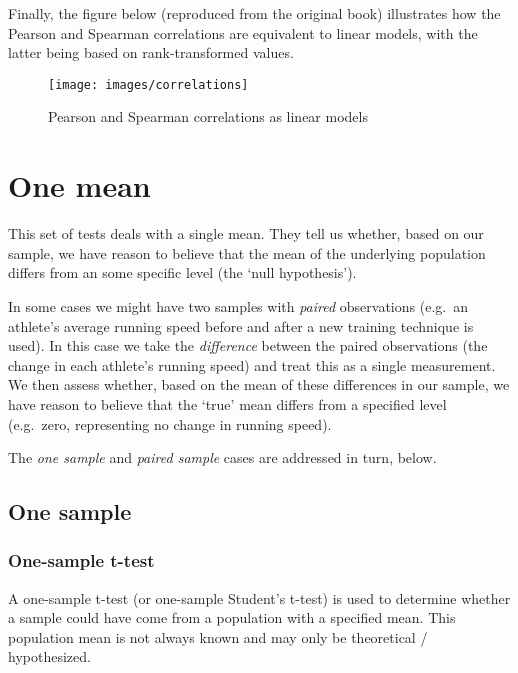 \documentclass[
  12pt,
]{krantz}
\begin{document}
Finally, the figure below (reproduced from the original book) illustrates how the Pearson and Spearman correlations are equivalent to linear models, with the latter being based on rank-transformed values.

\begin{figure}

{\centering \texttt{[image: images/correlations]} 

}

\caption{Pearson and Spearman correlations as linear models}\label{fig:unnamed-chunk-17}
\end{figure}

\hypertarget{one-mean}{%
\chapter{One mean}\label{one-mean}}

This set of tests deals with a single mean. They tell us whether, based on our sample, we have reason to believe that the mean of the underlying population differs from an some specific level (the `null hypothesis').

In some cases we might have two samples with \emph{paired} observations (e.g.~an athlete's average running speed before and after a new training technique is used). In this case we take the \emph{difference} between the paired observations (the change in each athlete's running speed) and treat this as a single measurement. We then assess whether, based on the mean of these differences in our sample, we have reason to believe that the `true' mean differs from a specified level (e.g.~zero, representing
no change in running speed).

The \emph{one sample} and \emph{paired sample} cases are addressed in turn, below.

\hypertarget{one-sample}{%
\section{One sample}\label{one-sample}}

\hypertarget{one-sample-t-test}{%
\subsection{One-sample t-test}\label{one-sample-t-test}}

A one-sample t-test (or one-sample Student's t-test) is used to determine whether a sample could have come from a population with a specified mean. This population mean is not always known and may only be theoretical / hypothesized.
\end{document}
